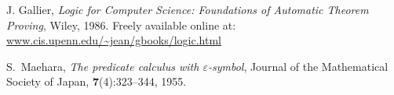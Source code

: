 \documentclass[12pt]{article}
\begin{document}

\begin{thebibliography}{99}

J. Gallier, 
\newblock\emph{Logic for Computer Science: Foundations of Automatic Theorem Proving},
Wiley, 1986. Freely available online at: \url{www.cis.upenn.edu/~jean/gbooks/logic.html}

S.~Maehara, 
\newblock\emph{The predicate calculus with $\varepsilon$-symbol},
Journal of the Mathematical Society of Japan, \textbf{7}(4):323--344, 1955.

\end{thebibliography}
\end{document}
